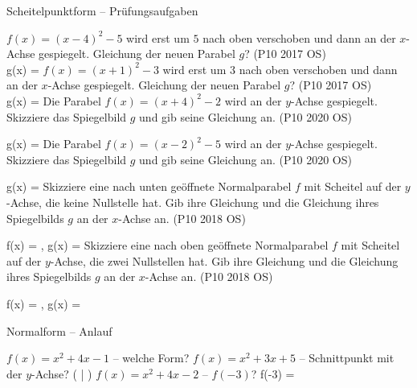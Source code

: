 \begin{aufgabe}{Scheitelpunktform – Prüfungsaufgaben}
\begin{teile}
\steil $f(x) = (x - 4)^2 - 5$ wird erst um $5$ nach oben verschoben und dann an der $x$-Achse gespiegelt. Gleichung der neuen Parabel $g$? \hfill (P10 2017 OS) \\ g(x) = \leerfeld
\steil $f(x) = (x + 1)^2 - 3$ wird erst um $3$ nach oben verschoben und dann an der $x$-Achse gespiegelt. Gleichung der neuen Parabel $g$? \hfill (P10 2017 OS) \\ g(x) = \leerfeld
\steil Die Parabel $f(x) = (x + 4)^2 - 2$ wird an der $y$-Achse gespiegelt. Skizziere das Spiegelbild $g$ und gib seine Gleichung an. \hfill (P10 2020 OS) \\

\begin{ksys}[xmin=-7,xmax=7,ymin=-3,ymax=7]
\end{ksys}
g(x) = \leerfeld
\steil Die Parabel $f(x) = (x - 2)^2 - 5$ wird an der $y$-Achse gespiegelt. Skizziere das Spiegelbild $g$ und gib seine Gleichung an. \hfill (P10 2020 OS) \\

\begin{ksys}[xmin=-5,xmax=5,ymin=-6,ymax=4]
\end{ksys}
g(x) = \leerfeld
\steil Skizziere eine nach unten geöffnete Normalparabel $f$ mit Scheitel auf der $y$-Achse, die keine Nullstelle hat. Gib ihre Gleichung und die Gleichung ihres Spiegelbilds $g$ an der $x$-Achse an. \hfill (P10 2018 OS) \\

\begin{ksys}[xmin=-4,xmax=4,ymin=-10,ymax=10,ystep=2]
\end{ksys}
f(x) = \leerfeld , g(x) = \leerfeld
\steil Skizziere eine nach oben geöffnete Normalparabel $f$ mit Scheitel auf der $y$-Achse, die zwei Nullstellen hat. Gib ihre Gleichung und die Gleichung ihres Spiegelbilds $g$ an der $x$-Achse an. \hfill (P10 2018 OS) \\

\begin{ksys}[xmin=-4,xmax=4,ymin=-10,ymax=10,ystep=2]
\end{ksys}
f(x) = \leerfeld , g(x) = \leerfeld
\end{teile}
\end{aufgabe}

\begin{aufgabe}{Normalform – Anlauf}
\begin{teile}
\teil $f(x) = x^2 + 4x - 1$ – welche Form?  
\teil $f(x) = x^2 + 3x + 5$ – Schnittpunkt mit der $y$-Achse? ( \leerfeld | \leerfeld )
\teil $f(x) = x^2 + 4x - 2$ – $f(-3)$? f(-3) = \leerfeld
\end{teile}
\end{aufgabe}

